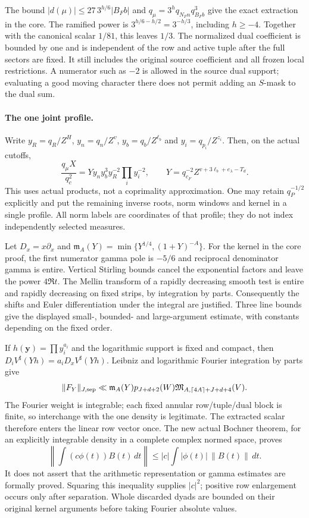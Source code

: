 The bound $|d(\mu)|\le27\,3^{h/6}|B_Fb|$ and
$q_\mu=3^h q_{N_Fn}q_{B_Fb}^3$ give the exact extraction in the core.
The ramified power is $3^{h/6-h/2}=3^{-h/3}$, including $h\ge-4$.
Together with the canonical scalar $1/81$, this leaves $1/3$.
The normalized dual coefficient is bounded by one and is independent
of the row and active tuple after the full sectors are fixed.
It still includes the original source coefficient and all frozen local
restrictions. A numerator such as $-2$ is allowed in the source dual
support; evaluating a good moving character there does not permit adding
an $S$-mask to the dual sum.

\paragraph{The one joint profile.}
Write $y_R=q_R/Z^H$, $y_n=q_n/Z^v$, $y_b=q_b/Z^{\ell_b}$ and
$y_i=q_{p_i}/Z^{z_i}$. Then, on the actual cutoffs,
\[
 \frac{q_\mu X}{q_c^2}
   =Yy_ny_b^3y_R^{-2}\prod_i y_i^{-2},\qquad
 Y=q_{c_F}^{-2}Z^{v+3\ell_b+e_\lambda-T_d}.
\]
This uses actual products, not a coprimality approximation.
One may retain $q_P^{-1/2}$ explicitly and put the remaining inverse
roots, norm windows and kernel in a single profile.
All norm labels are coordinates of that profile; they do not index
independently selected measures.

Let $D_x=x\partial_x$ and
$\mathfrak m_A(Y)=\min\{Y^{1/4},(1+Y)^{-A}\}$.
For the kernel in the core proof, the first numerator gamma pole is
$-5/6$ and reciprocal denominator gamma is entire.
Vertical Stirling bounds cancel the exponential factors and leave the
power $4\Re t$. The Mellin transform of a rapidly decreasing smooth test
is entire and rapidly decreasing on fixed strips, by integration by parts.
Consequently the shifts and Euler differentiation under the integral
are justified. Three line bounds give the displayed small-, bounded-
and large-argument estimate, with constants depending on the fixed order.

If $h(\boldsymbol y)=\prod y_i^{a_i}$ and the logarithmic support is
fixed and compact, then
$D_iV^\sharp(Yh)=a_iD_xV^\sharp(Yh)$.
Leibniz and logarithmic Fourier integration by parts give
\[
 \|F_Y\|_{J,\rm sep}\ll
 \mathfrak m_A(Y)p_{J+d+2}(W)
 \mathfrak M_{A,\lceil4A\rceil+J+d+4}(V).
\]
The Fourier weight is integrable; each fixed annular row/tuple/dual block
is finite, so interchange with the one density is legitimate.
The extracted scalar therefore enters the linear row vector once.
The new actual Bochner theorem, for an explicitly integrable density in a
complete complex normed space, proves
\[
 \left\|\int(c\phi(t))B(t)\,dt\right\|
 \le |c|\int |\phi(t)|\,\|B(t)\|\,dt.
\]
It does not assert that the arithmetic representation or gamma estimates
are formally proved. Squaring this inequality supplies $|c|^2$;
positive row enlargement occurs only after separation.
Whole discarded dyads are bounded on their original kernel arguments
before taking Fourier absolute values.

